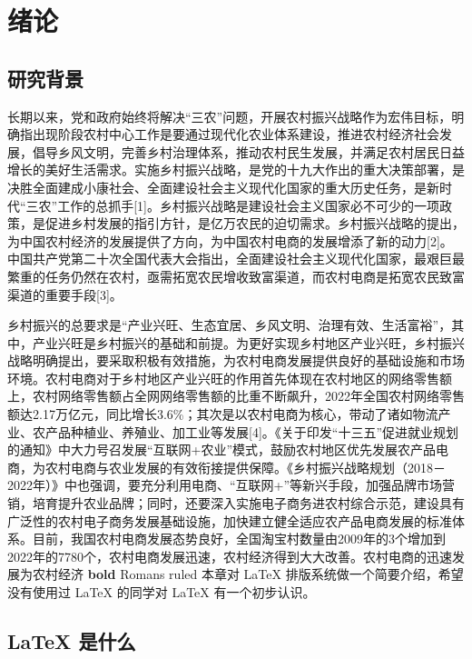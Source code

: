 
\chapter{绪论}
\section{研究背景}
长期以来，党和政府始终将解决“三农”问题，开展农村振兴战略作为宏伟目标，明确指出现阶段农村中心工作是要通过现代化农业体系建设，推进农村经济社会发展，倡导乡风文明，完善乡村治理体系，推动农村民生发展，并满足农村居民日益增长的美好生活需求。实施乡村振兴战略，是党的十九大作出的重大决策部署，是决胜全面建成小康社会、全面建设社会主义现代化国家的重大历史任务，是新时代“三农”工作的总抓手[1]。乡村振兴战略是建设社会主义国家必不可少的一项政策，是促进乡村发展的指引方针，是亿万农民的迫切需求。乡村振兴战略的提出，为中国农村经济的发展提供了方向，为中国农村电商的发展增添了新的动力[2]。中国共产党第二十次全国代表大会指出，全面建设社会主义现代化国家，最艰巨最繁重的任务仍然在农村，亟需拓宽农民增收致富渠道，而农村电商是拓宽农民致富渠道的重要手段[3]。

乡村振兴的总要求是“产业兴旺、生态宜居、乡风文明、治理有效、生活富裕”，其中，产业兴旺是乡村振兴的基础和前提。为更好实现乡村地区产业兴旺，乡村振兴战略明确提出，要采取积极有效措施，为农村电商发展提供良好的基础设施和市场环境。农村电商对于乡村地区产业兴旺的作用首先体现在农村地区的网络零售额上，农村网络零售额占全网网络零售额的比重不断飙升，2022年全国农村网络零售额达2.17万亿元，同比增长3.6\%；其次是以农村电商为核心，带动了诸如物流产业、农产品种植业、养殖业、加工业等发展[4]。《关于印发“十三五”促进就业规划的通知》中大力号召发展“互联网+农业”模式，鼓励农村地区优先发展农产品电商，为农村电商与农业发展的有效衔接提供保障。《乡村振兴战略规划（2018－2022年）》中也强调，要充分利用电商、“互联网+”等新兴手段，加强品牌市场营销，培育提升农业品牌；同时，还要深入实施电子商务进农村综合示范，建设具有广泛性的农村电子商务发展基础设施，加快建立健全适应农产品电商发展的标准体系。目前，我国农村电商发展态势良好，全国淘宝村数量由2009年的3个增加到2022年的7780个，农村电商发展迅速，农村经济得到大大改善。农村电商的迅速发展为农村经济
\textbf{bold} Romans ruled
本章对 \LaTeX{} 排版系统做一个简要介绍，希望没有使用过 \LaTeX{} 的同学对 \LaTeX{} 有一个初步认识。

\section*{\LaTeX{} 是什么}

